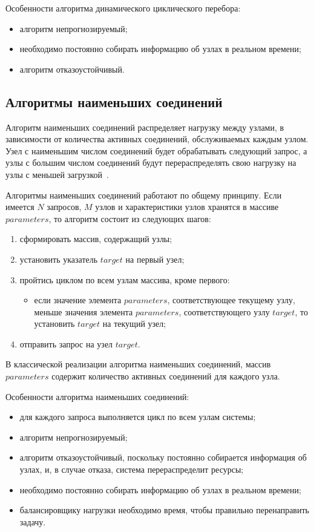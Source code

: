 Особенности алгоритма динамического циклического перебора:
\begin{itemize}
	\item алгоритм непрогнозируемый;
	\item необходимо постоянно собирать информацию об узлах в реальном времени;
	\item алгоритм отказоустойчивый.
\end{itemize}


\subsection{Алгоритмы наименьших соединений}

Алгоритм наименьших соединений распределяет нагрузку между узлами, в зависимости от количества активных соединений, обслуживаемых каждым узлом.
Узел с наименьшим числом соединений будет обрабатывать следующий запрос, а узлы с большим числом соединений будут перераспределять свою нагрузку на узлы с меньшей загрузкой~\cite{leastconnection}.

Алгоритмы наименьших соединений работают по общему принципу.
Если имеется $N$ запросов, $M$ узлов и характеристики узлов хранятся в массиве $parameters$, то алгоритм состоит из следующих шагов:
\begin{enumerate}
	\item сформировать массив, содержащий узлы;
	\item установить указатель $target$ на первый узел;
	\item пройтись циклом по всем узлам массива, кроме первого:
	\begin{itemize}
		\item если значение элемента $parameters$, соответствующее текущему узлу, меньше значения элемента $parameters$, соответствующего узлу $target$, то установить $target$ на текущий узел; 
	\end{itemize}
	\item отправить запрос на узел $target$.
\end{enumerate}

В классической реализации алгоритма наименьших соединений, массив $parameters$ содержит количество активных соединений для каждого узла.

Особенности алгоритма наименьших соединений:
\begin{itemize}
    \item для каждого запроса выполняется цикл по всем узлам системы;
	\item алгоритм непрогнозируемый; 
	\item алгоритм отказоустойчивый, поскольку постоянно собирается информация об узлах, и, в случае отказа, система перераспределит ресурсы;
	\item необходимо постоянно собирать информацию об узлах в реальном времени;
	\item балансировщику нагрузки необходимо время, чтобы правильно перенаправить задачу.
\end{itemize}

